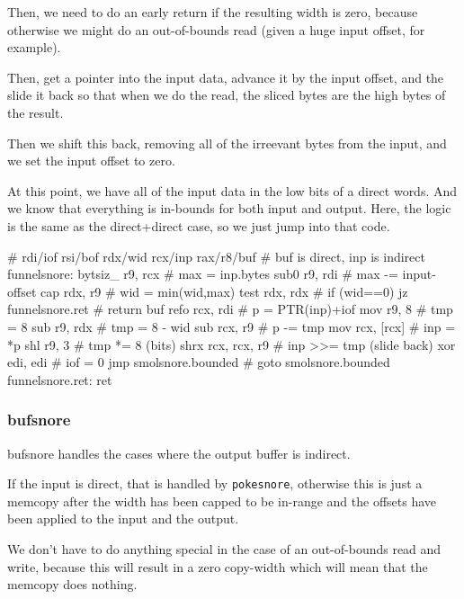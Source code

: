 Then, we need to do an early return if the resulting width is zero,
because otherwise we might do an out-of-bounds read (given a huge input
offset, for example).

Then, get a pointer into the input data, advance it by the input offset,
and the slide it back so that when we do the read, the sliced bytes are
the high bytes of the result.

Then we shift this back, removing all of the irreevant bytes from
the input, and we set the input offset to zero.

At this point, we have all of the input data in the low bits of a
direct words.  And we know that everything is in-bounds for both input
and output.  Here, the logic is the same as the direct+direct case,
so we just jump into that code.

\begin{asm}
	# rdi/iof rsi/bof rdx/wid rcx/inp rax/r8/buf
	# buf is direct, inp is indirect
funnelsnore:
	bytsiz_	r9, rcx                     #   max  = inp.bytes
	sub0	r9, rdi                     #   max -= input-offset
	cap	rdx, r9                     #   wid = min(wid,max)
	test	rdx, rdx                    #   if (wid==0)
	jz	funnelsnore.ret             #     return buf
	refo	rcx, rdi                    #   p = PTR(inp)+iof
	mov	r9, 8                       #   tmp = 8
	sub	r9, rdx                     #   tmp = 8 - wid
	sub	rcx, r9                     #   p -= tmp
	mov	rcx, [rcx]                  #   inp = *p
	shl	r9, 3                       #   tmp *= 8 (bits)
	shrx	rcx, rcx, r9                #   inp >>= tmp (slide back)
	xor	edi, edi                    #   iof = 0
	jmp	smolsnore.bounded           #   goto smolsnore.bounded
funnelsnore.ret:
	ret
\end{asm}

\subsubsection{bufsnore}

bufsnore handles the cases where the output buffer is indirect.

If the input is direct, that is handled by \lstinline|pokesnore|,
otherwise this is just a memcopy after the width has been capped to be
in-range and the offsets have been applied to the input and the output.

We don't have to do anything special in the case of an out-of-bounds read
and write, because this will result in a zero copy-width which will mean
that the memcopy does nothing.

